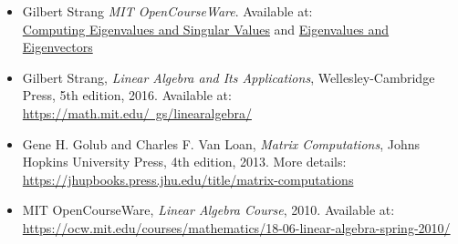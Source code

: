 \documentclass[journal]{IEEEtran}
\begin{document}
\begin{itemize}
    \item Gilbert Strang \textit{MIT OpenCourseWare}. Available at: \\\href{https://youtu.be/d32WV1rKoVk?si=PJ0xc0u7Det-Qjxe}{Computing Eigenvalues and Singular Values} and \href{https://youtu.be/lXNXrLcoerU?si=Cb9MwbQ23ImTScsT}{Eigenvalues and Eigenvectors}

    
    \item Gilbert Strang, \textit{Linear Algebra and Its Applications}, Wellesley-Cambridge Press, 5th edition, 2016. Available at: \\
    \href{https://math.mit.edu/~gs/linearalgebra/}{https://math.mit.edu/~gs/linearalgebra/}

    \item Gene H. Golub and Charles F. Van Loan, \textit{Matrix Computations}, Johns Hopkins University Press, 4th edition, 2013. More details: \\
    \href{https://jhupbooks.press.jhu.edu/title/matrix-computations}{https://jhupbooks.press.jhu.edu/title/matrix-computations}

    \item MIT OpenCourseWare, \textit{Linear Algebra Course}, 2010. Available at: \\
    \href{https://ocw.mit.edu/courses/mathematics/18-06-linear-algebra-spring-2010/}{https://ocw.mit.edu/courses/mathematics/18-06-linear-algebra-spring-2010/}
\end{itemize}
\end{document}
